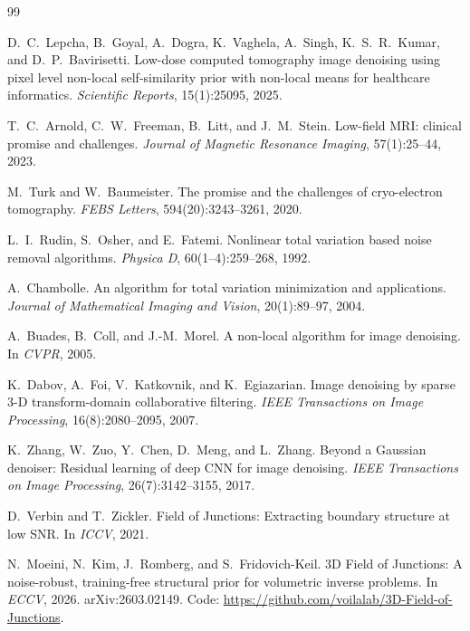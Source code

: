 \documentclass[11pt]{article}
\begin{document}
\begin{thebibliography}{99}

D.~C.~Lepcha, B.~Goyal, A.~Dogra, K.~Vaghela, A.~Singh, K.~S.~R.~Kumar, and
D.~P.~Bavirisetti.
\newblock Low-dose computed tomography image denoising using pixel level
non-local self-similarity prior with non-local means for healthcare
informatics.
\newblock \emph{Scientific Reports}, 15(1):25095, 2025.

T.~C.~Arnold, C.~W.~Freeman, B.~Litt, and J.~M.~Stein.
\newblock Low-field {MRI}: clinical promise and challenges.
\newblock \emph{Journal of Magnetic Resonance Imaging}, 57(1):25--44, 2023.

M.~Turk and W.~Baumeister.
\newblock The promise and the challenges of cryo-electron tomography.
\newblock \emph{FEBS Letters}, 594(20):3243--3261, 2020.

L.~I.~Rudin, S.~Osher, and E.~Fatemi.
\newblock Nonlinear total variation based noise removal algorithms.
\newblock \emph{Physica D}, 60(1--4):259--268, 1992.

A.~Chambolle.
\newblock An algorithm for total variation minimization and applications.
\newblock \emph{Journal of Mathematical Imaging and Vision}, 20(1):89--97,
2004.

A.~Buades, B.~Coll, and J.-M.~Morel.
\newblock A non-local algorithm for image denoising.
\newblock In \emph{CVPR}, 2005.

K.~Dabov, A.~Foi, V.~Katkovnik, and K.~Egiazarian.
\newblock Image denoising by sparse 3-D transform-domain collaborative
filtering.
\newblock \emph{IEEE Transactions on Image Processing}, 16(8):2080--2095,
2007.

K.~Zhang, W.~Zuo, Y.~Chen, D.~Meng, and L.~Zhang.
\newblock Beyond a Gaussian denoiser: Residual learning of deep CNN for
image denoising.
\newblock \emph{IEEE Transactions on Image Processing}, 26(7):3142--3155,
2017.

D.~Verbin and T.~Zickler.
\newblock Field of Junctions: Extracting boundary structure at low SNR.
\newblock In \emph{ICCV}, 2021.

N.~Moeini, N.~Kim, J.~Romberg, and S.~Fridovich-Keil.
\newblock 3D Field of Junctions: A noise-robust, training-free structural prior
for volumetric inverse problems.
\newblock In \emph{ECCV}, 2026. arXiv:2603.02149.
\newblock Code: \url{https://github.com/voilalab/3D-Field-of-Junctions}.


\end{thebibliography}
\end{document}
